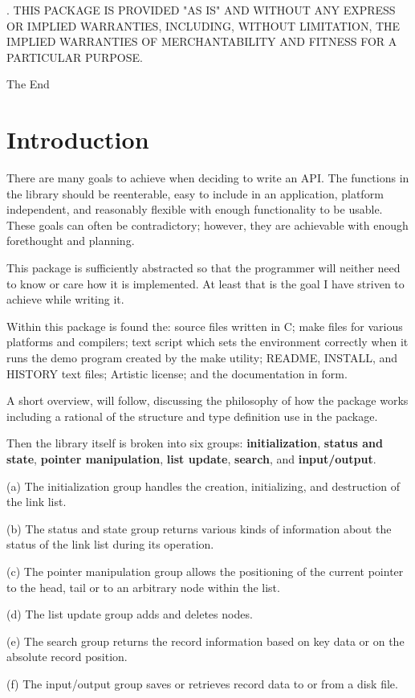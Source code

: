 \documentclass[10pt,letterpaper,titlepage]{article}
\newenvironment{lquote}{\begin{list}{}{}\item[]}{\end{list}}
\begin{document}
. THIS PACKAGE IS PROVIDED "AS IS" AND WITHOUT ANY EXPRESS OR IMPLIED WARRANTIES, INCLUDING, WITHOUT LIMITATION, THE IMPLIED WARRANTIES OF MERCHANTABILITY AND FITNESS FOR A PARTICULAR PURPOSE.

\begin{center}
The End
\end{center}
\pagebreak

\section{Introduction}
There are many goals to achieve when deciding to write an API.  The functions in the library should be reenterable, easy to include in an application, platform independent, and reasonably flexible with enough functionality to be usable.  These goals can often be contradictory; however, they are achievable with enough forethought and planning.
\vspace{8pt}

\noindent
This package is sufficiently abstracted so that the programmer will neither need to know or care how it is implemented.  At least that is the goal I have striven to achieve while writing it.
\vspace{8pt}

\noindent
Within this package is found the: source files written in C; make files for various platforms and compilers; text script which sets the environment correctly when it runs the demo program created by the make utility; README, INSTALL, and HISTORY text files; Artistic license; and the documentation in \LaTeXe form.
\vspace{8pt}

\noindent
A short overview, will follow, discussing the philosophy of how the package works including a rational of the structure and type definition use in the package.
\vspace{8pt}

\noindent
Then the library itself is broken into six groups: \textbf{initialization}, \textbf{status and state}, \textbf{pointer manipulation}, \textbf{list update}, \textbf{search}, and \textbf{input/output}.

\begin{lquote}
(a) The initialization group handles the creation, initializing, and destruction of the link list.

(b) The status and state group returns various kinds of information about the status of the link list during its operation.

(c) The pointer manipulation group allows the positioning of the current pointer to the head, tail or to an arbitrary node within the list.

(d) The list update group adds and deletes nodes.

(e) The search group returns the record information based on key data or on the absolute record position.

(f) The input/output group saves or retrieves record data to or from a disk file.
\end{lquote}
\end{document}
